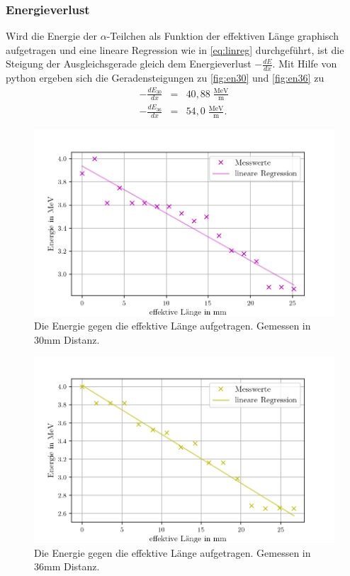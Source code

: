 \subsubsection*{Energieverlust}
Wird die Energie der $\alpha$-Teilchen als Funktion der effektiven Länge 
graphisch aufgetragen und eine lineare Regression wie in \autoref{eq:linreg} durchgeführt,
ist die Steigung der Ausgleichsgerade gleich dem Energieverlust $-\frac{dE}{dx}$.
Mit Hilfe von python ergeben sich die Geradensteigungen zu \autoref{fig:en30} und \autoref{fig:en36} zu
\begin{eqnarray}
 - \frac{dE_{30}}{dx} &=& 40,88 \;  \mathrm{\frac{MeV}{m}} \nonumber  \\
 - \frac{dE_{36}}{dx} &=& 54,0  \; \mathrm{\frac{MeV}{m}}. \nonumber  
\end{eqnarray}

\begin{figure}[H]
  \centering
  \includegraphics[width = \textwidth]{content/energie30mm.png}
  \caption{Die Energie gegen die effektive Länge aufgetragen. Gemessen in 30mm Distanz.}
  \label{fig:en30}
\end{figure}
\begin{figure}[H]
  \centering
  \includegraphics[width = \textwidth]{content/energie36mm.png}
  \caption{Die Energie gegen die effektive Länge aufgetragen. Gemessen in 36mm Distanz.}
  \label{fig:en36}
\end{figure}


